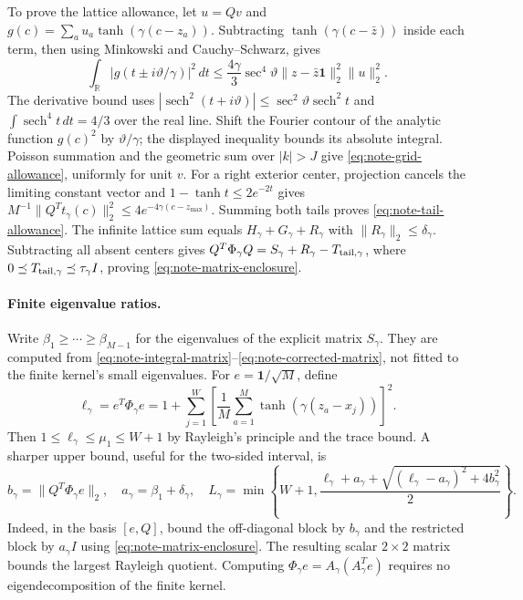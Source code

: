 To prove the lattice allowance, let $u=Qv$ and
$g(c)=\sum_a u_a\tanh(\gamma(c-z_a))$. Subtracting
$\tanh(\gamma(c-\bar z))$ inside each term, then using Minkowski and
Cauchy--Schwarz, gives
\[
 \int_{\mathbb R}|g(t\pm i\vartheta/\gamma)|^2\,dt
 \le\frac{4\gamma}{3}\sec^4\vartheta
 \|z-\bar z\mathbf1\|_2^2\|u\|_2^2.
\]
The derivative bound uses
$|\operatorname{sech}^2(t+i\vartheta)|\le
\sec^2\vartheta\operatorname{sech}^2t$ and
$\int\operatorname{sech}^4t\,dt=4/3$ over the real line.
Shift the Fourier contour of the analytic function $g(c)^2$ by
$\vartheta/\gamma$; the displayed inequality bounds its absolute integral.
Poisson summation and the geometric sum over $|k|>J$ give
\eqref{eq:note-grid-allowance}, uniformly for unit $v$.
For a right exterior center, projection cancels the limiting constant
vector and $1-\tanh t\le2e^{-2t}$ gives
$M^{-1}\|Q^Tt_\gamma(c)\|_2^2\le4e^{-4\gamma(c-z_{\max})}$.
Summing both tails proves \eqref{eq:note-tail-allowance}.
The infinite lattice sum equals $H_\gamma+G_\gamma+R_\gamma$ with
$\|R_\gamma\|_2\le\delta_\gamma$. Subtracting all absent centers gives
$Q^T\Phi_\gamma Q=S_\gamma+R_\gamma-T_{\rm tail,\gamma}$,
where $0\preceq T_{\rm tail,\gamma}\preceq\tau_\gamma I$, proving
\eqref{eq:note-matrix-enclosure}.

\paragraph{Finite eigenvalue ratios.}
Write $\beta_1\ge\cdots\ge\beta_{M-1}$ for the eigenvalues of the
explicit matrix $S_\gamma$. They are computed from
\eqref{eq:note-integral-matrix}--\eqref{eq:note-corrected-matrix},
not fitted to the finite kernel's small eigenvalues.
For $e=\mathbf1/\sqrt M$, define
\begin{equation}
 \ell_\gamma=e^T\Phi_\gamma e
 =1+\sum_{j=1}^W\left[\frac1M\sum_{a=1}^M
 \tanh(\gamma(z_a-x_j))\right]^2.
 \label{eq:note-top-lower}
\end{equation}
Then $1\le\ell_\gamma\le\mu_1\le W+1$ by Rayleigh's principle and the
trace bound. A sharper upper bound, useful for the two-sided interval, is
\begin{equation}
 b_\gamma=\|Q^T\Phi_\gamma e\|_2,\quad
 a_\gamma=\beta_1+\delta_\gamma,\quad
 L_\gamma=\min\!\left\{W+1,
 \frac{\ell_\gamma+a_\gamma+
 \sqrt{(\ell_\gamma-a_\gamma)^2+4b_\gamma^2}}2\right\}.
 \label{eq:note-top-upper}
\end{equation}
Indeed, in the basis $[e,Q]$, bound the off-diagonal block by $b_\gamma$
and the restricted block by $a_\gamma I$ using
\eqref{eq:note-matrix-enclosure}. The resulting scalar $2\times2$
matrix bounds the largest Rayleigh quotient. Computing
$\Phi_\gamma e=A_\gamma(A_\gamma^Te)$ requires no eigendecomposition
of the finite kernel.

